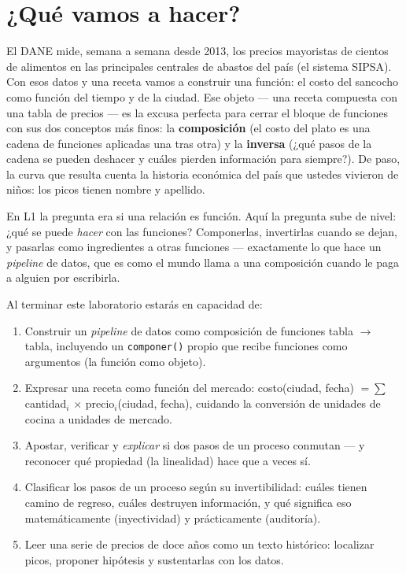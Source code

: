 \documentclass[12pt,letterpaper]{article}
\begin{document}
\section{¿Qué vamos a hacer?}
El DANE mide, semana a semana desde 2013, los precios mayoristas de cientos de alimentos en las principales centrales de abastos del país (el sistema SIPSA). Con esos datos y una receta vamos a construir una función: el costo del sancocho como función del tiempo y de la ciudad. Ese objeto --- una receta compuesta con una tabla de precios --- es la excusa perfecta para cerrar el bloque de funciones con sus dos conceptos más finos: la \textbf{composición} (el costo del plato es una cadena de funciones aplicadas una tras otra) y la \textbf{inversa} (¿qué pasos de la cadena se pueden deshacer y cuáles pierden información para siempre?). De paso, la curva que resulta cuenta la historia económica del país que ustedes vivieron de niños: los picos tienen nombre y apellido.

En L1 la pregunta era si una relación es función. Aquí la pregunta sube de nivel: ¿qué se puede \emph{hacer} con las funciones? Componerlas, invertirlas cuando se dejan, y pasarlas como ingredientes a otras funciones --- exactamente lo que hace un \emph{pipeline} de datos, que es como el mundo llama a una composición cuando le paga a alguien por escribirla.

\begin{cajalogros}
Al terminar este laboratorio estarás en capacidad de:
\begin{enumerate}[label=\arabic*., itemsep=0.1em]
    \item Construir un \emph{pipeline} de datos como composición de funciones tabla $\to$ tabla, incluyendo un \texttt{componer()} propio que recibe funciones como argumentos (la función como objeto).
    \item Expresar una receta como función del mercado: costo(ciudad, fecha) $= \sum$ cantidad$_i$ $\times$ precio$_i$(ciudad, fecha), cuidando la conversión de unidades de cocina a unidades de mercado.
    \item Apostar, verificar y \emph{explicar} si dos pasos de un proceso conmutan --- y reconocer qué propiedad (la linealidad) hace que a veces sí.
    \item Clasificar los pasos de un proceso según su invertibilidad: cuáles tienen camino de regreso, cuáles destruyen información, y qué significa eso matemáticamente (inyectividad) y prácticamente (auditoría).
    \item Leer una serie de precios de doce años como un texto histórico: localizar picos, proponer hipótesis y sustentarlas con los datos.
\end{enumerate}
\end{cajalogros}
\end{document}
